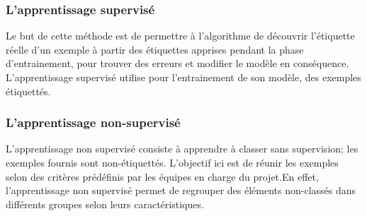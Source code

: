 \subsubsection{L'apprentissage supervisé}
Le but de cette méthode est de permettre à l'algorithme  de découvrir 
l'étiquette réelle d'un exemple à partir des étiquettes apprises pendant la
phase d'entrainement, pour trouver des erreurs et modifier le modèle en 
conséquence. L'apprentissage supervisé utilise pour l'entrainement de son modèle,
des exemples étiquettés.

\subsubsection{L'apprentissage non-supervisé}
L’apprentissage non supervisé consiste à apprendre à classer sans supervision; les
exemples fournis sont non-étiquettés. L'objectif ici  est de réunir les 
exemples selon des critères prédéfinis par les équipes en charge du projet.En effet,
l’apprentissage non supervisé permet de regrouper des éléments non-classés dans 
différents groupes selon leurs caractéristiques.
